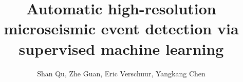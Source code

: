 
\title{Automatic high-resolution microseismic event detection via supervised machine learning}

\renewcommand{\thefootnote}{\fnsymbol{footnote}} 


\author{Shan Qu\footnotemark[1], Zhe Guan\footnotemark[2], Eric Verschuur\footnotemark[1],  Yangkang Chen\footnotemark[2]}
\address{
\footnotemark[1] Delft University of Technology, Delphi consortium \\
\footnotemark[2] Rice University, Applied Physics Program \\
\footnotemark[3] Zhejiang university, School of Earth Sciences
}


\maketitle


